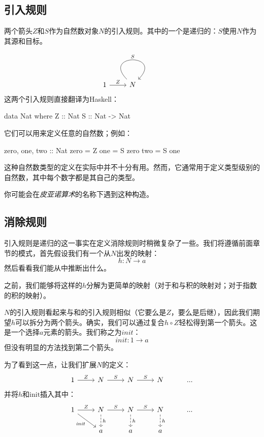 \documentclass[DaoFP]{subfiles}
\begin{document}
\subsection{引入规则}

两个箭头$Z$和$S$作为自然数对象$N$的引入规则。其中的一个是递归的：$S$使用$N$作为其源和目标。

\[
 \begin{tikzcd}
 1
 \arrow[r, "Z"]
 &N
 \arrow[out=135, in=45, loop, "S"]
 \end{tikzcd}
\]
这两个引入规则直接翻译为Haskell：

\begin{haskell}
data Nat where
  Z :: Nat
  S :: Nat -> Nat
\end{haskell}
它们可以用来定义任意的自然数；例如：

\begin{haskell}
zero, one, two :: Nat
zero = Z
one  = S zero
two  = S one
\end{haskell}

这种自然数类型的定义在实际中并不十分有用。然而，它通常用于定义类型级别的自然数，其中每个数字都是其自己的类型。

你可能会在\emph{皮亚诺算术}的名称下遇到这种构造。

\subsection{消除规则}

引入规则是递归的这一事实在定义消除规则时稍微复杂了一些。我们将遵循前面章节的模式，首先假设我们有一个从$N$出发的映射：
\[ h \colon N \to a \]
然后看看我们能从中推断出什么。

之前，我们能够将这样的$h$分解为更简单的映射（对于和与积的映射对；对于指数的积的映射）。

$N$的引入规则看起来与和的引入规则相似（它要么是$Z$，要么是后继），因此我们期望$h$可以拆分为两个箭头。确实，我们可以通过复合$h \circ Z$轻松得到第一个箭头。这是一个选择$a$元素的箭头。我们称之为$\mathit{init}$：
\[\mathit{init} \colon 1 \to a \]
但没有明显的方法找到第二个箭头。

为了看到这一点，让我们扩展$N$的定义：
\[
 \begin{tikzcd}
 1
 \arrow[r, "Z"]
 &N
  \arrow[r, "S"]
&N
  \arrow[r, "S"]
&N
& ...
  \end{tikzcd}
\]
并将$h$和$\text{init}$插入其中：
\[
 \begin{tikzcd}
 1
 \arrow[r, "Z"]
 \arrow[rd, "\mathit{init}"']
 &N
  \arrow[r, "S"]
\arrow[d, dashed, "h"]
&N
  \arrow[r, "S"]
\arrow[d, dashed, "h"]
&N
\arrow[d, dashed, "h"]
& ...
\\
& a
& a
& a
  \end{tikzcd}
\]
\end{document}
